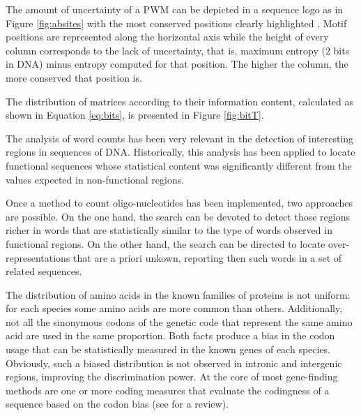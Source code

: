 The amount of uncertainty of a PWM can be depicted in a sequence logo as in Figure \ref{fig:absites}
with the most conserved positions clearly highlighted \citep{schneider:1990a}. Motif positions are 
represented along the horizontal axis while the height of every column corresponds to the lack of uncertainty, 
that is, maximum entropy ($2$ bits in DNA) minus entropy computed for that position. The higher
the column, the more conserved that position is.

The distribution of  matrices \citep{matys:2003a} according to their information content,
calculated as shown in Equation \ref{eq:bits}, is presented in Figure \ref{fig:bitT}.


The analysis of word counts has been very relevant in the detection of interesting regions 
in sequences of DNA. Historically, this analysis has been applied to locate functional sequences 
whose statistical content was significantly different from the values expected in non-functional
regions.

Once a method to count oligo-nucleotides has been implemented, two approaches are possible. On the
one hand, the search can be devoted to detect those regions richer in words that are statistically 
similar to the type of words observed in functional regions. On the other hand, the search can be
directed to locate over-representations that are a priori unkown, reporting then such words in 
a set of related sequences.


 
The distribution of amino acids in the known families of proteins is not uniform: for each species
some amino acids are more common than others. Additionally, not all the sinonymous codons of the 
genetic code that represent the same amino acid are used in the same proportion.
Both facts produce a bias in the codon usage that can be statistically measured in the known genes
of each species. 
Obviously, such a biased distribution is not observed in intronic and intergenic
regions, improving the discrimination power. At the core of most gene-finding methods are one or 
more coding measures that evaluate the codingness of a sequence based on the codon bias (see 
\citet{fickett:1992a} for a review). 

